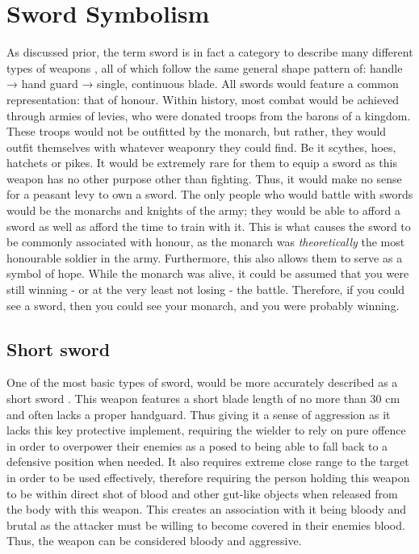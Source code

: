 \documentclass{article}
\begin{document}
\section{Sword Symbolism} \label{swordSymbol}
As discussed prior, the term sword is in fact a category to describe many different types of weapons \parencite{furat1998brief}, all of which follow the same general shape pattern of: handle → hand guard → single, continuous blade.
All swords would feature a common representation: that of honour. Within history, most combat would be achieved through armies of levies, who were donated troops from the barons of a kingdom. These troops would not be outfitted by the monarch, but rather, they would outfit themselves with whatever weaponry they could find. Be it scythes, hoes, hatchets or pikes. It would be extremely rare for them to equip a sword as this weapon has no other purpose other than fighting. Thus, it would make no sense for a peasant levy to own a sword. The only people who would battle with swords would be the monarchs and knights of the army; they would be able to afford a sword as well as afford the time to train with it. This is what causes the sword to be commonly associated with honour, as the monarch was \textit{theoretically} the most honourable soldier in the army. Furthermore, this also allows them to serve as a symbol of hope. While the monarch was alive, it could be assumed that you were still winning - or at the very least not losing - the battle. Therefore, if you could see a sword, then you could see your monarch, and you were probably winning.

\subsection{Short sword} \label{shortSwordSymbol}
One of the most basic types of sword, would be more accurately described as a short sword \parencite{mcnab2010swords}. This weapon features a short blade length of no more than 30 cm and often lacks a proper handguard. Thus giving it a sense of aggression as it lacks this key protective implement, requiring the wielder to rely on pure offence in order to overpower their enemies as a posed to being able to fall back to a defensive position when needed. It also requires extreme close range to the target in order to be used effectively, therefore requiring the person holding this weapon to be within direct shot of blood and other gut-like objects when released from the body with this weapon. This creates an association with it being bloody and brutal as the attacker must be willing to become covered in their enemies blood. Thus, the weapon can be considered bloody and aggressive.
\end{document}
